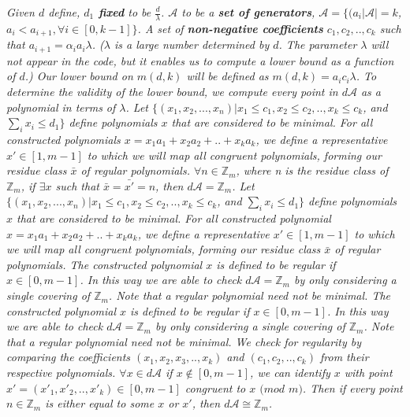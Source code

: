 \begin{centering}
\begin{block}
\noindent
\textsl{
Given $d$ define,\n
\emph{\bf{$d_{1}$ fixed}} to be $\frac{d}{\lambda}$.\n
$\mathcal{A}$ to be a \emph{\bf{set of generators}}, $\mathcal{A} = \{ (a_{i} \vert \mathcal{A} \vert = k$, $a_{i} < a_{i+1},  \forall i \in [0, k-1] \} $.\n
A set of \emph{\bf{non-negative coefficients}} $c_{1}, c_{2}, .. , c_{k}$ such that $a_{i+1} = \alpha_{i}a_{i} \lambda$.\n \n
($\lambda$ is a large number determined by $d$. The parameter $\lambda$ will not appear in the code, but it enables us to compute a lower bound as a function of $d$.)\n
Our lower bound on $m(d, k)$ will be defined as $m(d, k) = a_{i}c_{i} \lambda$. To determine the validity of the lower bound, we compute every point in $d \mathcal{A}$ as a polynomial in terms of $\lambda$.\n
Let $ \{ (x_{1}, x_{2}, ... , x_{n}) \vert x_{1} \leq c_{1}, x_{2} \leq c_{2}, .. , x_{k} \leq c_{k}$, and $\sum_{i} x_{i} \leq d_{1} \}$ define polynomials $x$ that are considered to be minimal.\n
For all constructed polynomials $x = x_{1}a_{1} + x_{2}a_{2} + .. + x_{k}a_{k}$, we define a representative $x' \in [1, m-1]$ to which we will map all congruent polynomials, forming our residue class $\bar{x}$ of regular polynomials.\n
$\forall n \in \mathbb{Z}_{m}$, where n is the residue class of $\mathbb{Z}_{m}$, if $\exists  x$ such that $\bar{x} = \bar{x'}= n$, then $d \mathcal{A} = \mathbb{Z}_{m}$.\n
Let $ \{ (x_{1}, x_{2}, ... , x_{n}) \vert x_{1} \leq c_{1}, x_{2} \leq c_{2}, .. , x_{k} \leq c_{k}$, and $\sum_{i} x_{i} \leq d_{1} \}$ define polynomials $x$ that are considered to be minimal.\n
For all constructed polynomial $x = x_{1}a_{1} + x_{2}a_{2} + .. + x_{k}a_{k}$, we define a representative $x' \in [1, m-1]$ to which we will map all congruent polynomials, forming our residue class $\bar{x}$ of regular polynomials.\n
The constructed polynomial $x$ is defined to be regular if $x \in [0, m-1]$. In this way we are able to check $d \mathcal{A} = \mathbb{Z}_{m}$ by only considering a single covering of $\mathbb{Z}_{m}$.\n
Note that a regular polynomial need not be minimal.\n
The constructed polynomial $x$ is defined to be regular if $x \in [0, m-1]$. In this way we are able to check $d \mathcal{A} = \mathbb{Z}_{m}$ by only considering a single covering of $\mathbb{Z}_{m}$.\n
Note that a regular polynomial need not be minimal.\n
We check for regularity by comparing the coefficients $(x_{1}, x_{2}, x_{3}, .. , x_{k})$ and $(c_{1}, c_{2}, .. , c_{k})$ from their respective polynomials.\n
$\forall x \in d \mathcal{A}$ if $x \notin [0, m-1]$, we can identify $x$ with point $x' = (x'_{1}, x'_{2}, .. , x'_{k}) \in [0, m-1]$ congruent to $x$ $(mod$ $m)$.  Then if every point $n \in \mathbb{Z}_{m}$ is either equal to some $x$ or $x'$, then $d \mathcal{A} \cong \mathbb{Z}_m$.\n
}
\end{block}
\end{centering}
